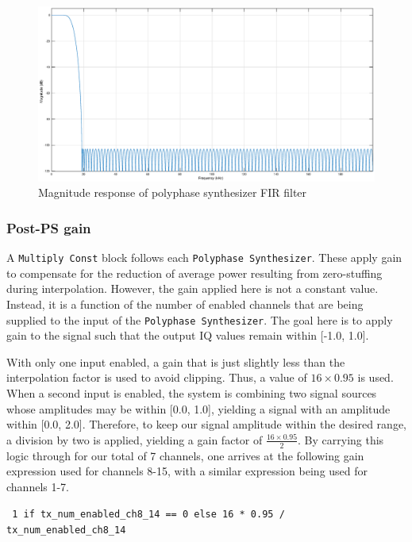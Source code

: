 \begin{figure}[h]
  \centering
  \includegraphics[width=6in]{images/frs/filter/tx/polyphase-synth-fir.eps}
  \caption{Magnitude response of polyphase synthesizer FIR filter}
  \label{fig:filtresp_tx_ps}
\end{figure}

\subsubsection{Post-PS gain}

A \texttt{Multiply Const} block follows each \texttt{Polyphase Synthesizer}.
These apply gain to compensate for the reduction of average power
resulting from zero-stuffing during interpolation.  However, the gain applied
here is not a constant value. Instead, it is a function of the number of
enabled channels that are being supplied to the input of the \texttt{Polyphase
Synthesizer}. The goal here is to apply gain to the signal such that the output IQ
values remain within [-1.0, 1.0].

With only one input enabled, a gain that is just slightly less than
the interpolation factor is used to avoid clipping. Thus, a value of $16 \times
0.95$ is used. When a second input is enabled, the system is combining two signal
sources whose amplitudes may be within [0.0, 1.0], yielding a signal with an
amplitude within [0.0, 2.0].  Therefore, to keep our signal amplitude within
the desired range, a division by two is applied, yielding a gain factor of
$\frac{16 \times 0.95}{2}$. By carrying this logic through for our total of 7
channels, one arrives at the following gain expression used for channels 8-15,
with a similar expression being used for channels 1-7.

\begin{center}
    \footnotesize{ \texttt{
        1 if tx\_num\_enabled\_ch8\_14 == 0 else 16 * 0.95 / tx\_num\_enabled\_ch8\_14
    } }
\end{center}

